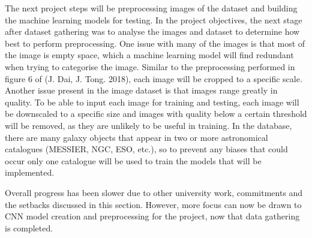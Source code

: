 \documentclass[12pt,runningheads]{llncs}
\begin{document}
The next project steps will be preprocessing images of the dataset and building the machine
learning models for testing. In the project objectives, the next stage after dataset gathering
was to analyse the images and dataset to determine how best to perform preprocessing. 
One issue with many of the images is that most of the image is empty space, which a machine 
learning model will find redundant when trying to categorise the image. Similar to the 
preprocessing performed in figure 6 of (J. Dai, J. Tong. 2018), each image will be cropped 
to a specific scale. Another issue present in the image dataset is that images range greatly 
in quality. To be able to input each image for training and testing, each image will be 
downscaled to a specific size and images with quality below a certain threshold will be removed, 
as they are unlikely to be useful in training. In the database, there are many galaxy objects 
that appear in two or more astronomical catalogues (MESSIER, NGC, ESO, etc.), so to prevent 
any biases that could occur only one catalogue will be used to train the models that will be 
implemented.

Overall progress has been slower due to other university work, commitments and the setbacks 
discussed in this section. However, more focus can now be drawn to CNN model creation and 
preprocessing for the project, now that data gathering is completed.


\end{document}
